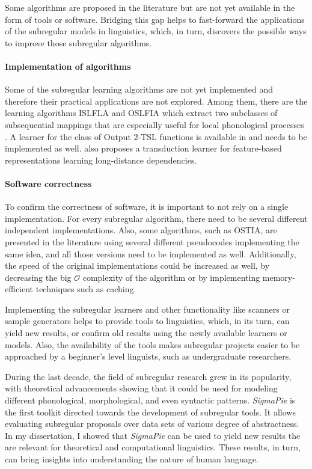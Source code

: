 Some algorithms are proposed in the literature but are not yet available in the form of tools or software.
Bridging this gap helps to fast-forward the applications of the subregular models in linguistics, which, in turn, discovers the possible ways to improve those subregular algorithms.


\paragraph{Implementation of algorithms}
Some of the subregular learning algorithms are not yet implemented and therefore their practical applications are not explored.
Among them, there are the learning algorithms ISLFLA and OSLFIA which extract two subclasses of subsequential mappings that are especially useful for local phonological processes \citep{ChandleeEtAl2014,ChandleeEtAl2015}.
A learner for the class of Output $2$-TSL functions is available in \citep{BurnessMcMullin2019} and needs to be implemented as well.
\cite{chandlee-etal-2019-learning} also proposes a transduction learner for feature-based representations learning long-distance dependencies.

\paragraph{Software correctness}
To confirm the correctness of software, it is important to not rely on a single implementation.
For every subregular algorithm, there need to be several different independent implementations.
Also, some algorithms, such as OSTIA, are presented in the literature using several different pseudocodes implementing the same idea, and all those versions need to be implemented as well.
Additionally, the speed of the original implementations could be increased as well, by decreasing the big $\mathcal{O}$ complexity of the algorithm or by implementing memory-efficient techniques such as caching.

\bigskip\bigskip

Implementing the subregular learners and other functionality like scanners or sample generators helps to provide tools to linguistics, which, in its turn, can yield new results, or confirm old results using the newly available learners or models.
Also, the availability of the tools makes subregular projects easier to be approached by a beginner's level linguists, such as undergraduate researchers.

During the last decade, the field of subregular research grew in its popularity, with theoretical advancements showing that it could be used for modeling different phonological, morphological, and even syntactic patterns.
\emph{SigmaPie} \href{https://pypi.org/project/SigmaPie/}{\faCube} is the first toolkit directed towards the development of subregular tools.
It allows evaluating subregular proposals over data sets of various degree of abstractness.
In my dissertation, I showed that \emph{SigmaPie} can be used to yield new results the are relevant for theoretical and computational linguistics.
These results, in turn, can bring insights into understanding the nature of human language.
